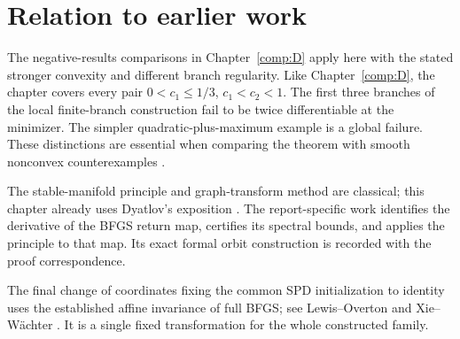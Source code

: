 \endgroup


\section*{Relation to earlier work}
The negative-results comparisons in Chapter~\ref{comp:D} apply here with the stated stronger convexity and different branch regularity. Like Chapter~\ref{comp:D}, the chapter covers every pair $0<c_1\le1/3$, $c_1<c_2<1$. The first three branches of the local finite-branch construction fail to be twice differentiable at the minimizer. The simpler quadratic-plus-maximum example is a global failure. These distinctions are essential when comparing the theorem with smooth nonconvex counterexamples \cite{NEG_M07,NEG_M14,NEG_DIAO26}.

The stable-manifold principle and graph-transform method are classical; this chapter already uses Dyatlov's exposition \cite[Sections 3--4]{DY}. The report-specific work identifies the derivative of the BFGS return map, certifies its spectral bounds, and applies the principle to that map. Its exact formal orbit construction is recorded with the proof correspondence.

The final change of coordinates fixing the common SPD initialization to identity uses the established affine invariance of full BFGS; see Lewis--Overton \cite[Section 2]{LO} and Xie--W\"achter \cite[Theorem II.1]{XW}. It is a single fixed transformation for the whole constructed family.
